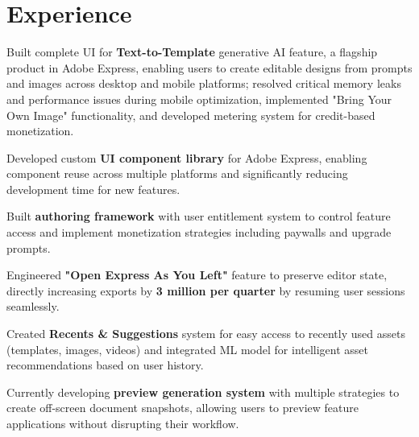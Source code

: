 \documentclass[]{deedy-resume-reversed}
\begin{document}
\begin{minipage}[t]{0.60\textwidth}
\section{Experience}
\vspace{\topsep} %
\begin{tightemize}
\item Built complete UI for \textbf{Text-to-Template} generative AI feature, a flagship product in Adobe Express, enabling users to create editable designs from prompts and images across desktop and mobile platforms; resolved critical memory leaks and performance issues during mobile optimization, implemented "Bring Your Own Image" functionality, and developed metering system for credit-based monetization.
\item Developed custom \textbf{UI component library} for Adobe Express, enabling component reuse across multiple platforms and significantly reducing development time for new features.
\item Built \textbf{authoring framework} with user entitlement system to control feature access and implement monetization strategies including paywalls and upgrade prompts.
\item Engineered \textbf{"Open Express As You Left"} feature to preserve editor state, directly increasing exports by \textbf{3 million per quarter} by resuming user sessions seamlessly.
\item Created \textbf{Recents \& Suggestions} system for easy access to recently used assets (templates, images, videos) and integrated ML model for intelligent asset recommendations based on user history.
\item Currently developing \textbf{preview generation system} with multiple strategies to create off-screen document snapshots, allowing users to preview feature applications without disrupting their workflow.
\end{tightemize}
\sectionsep


\end{minipage}
\end{document}
